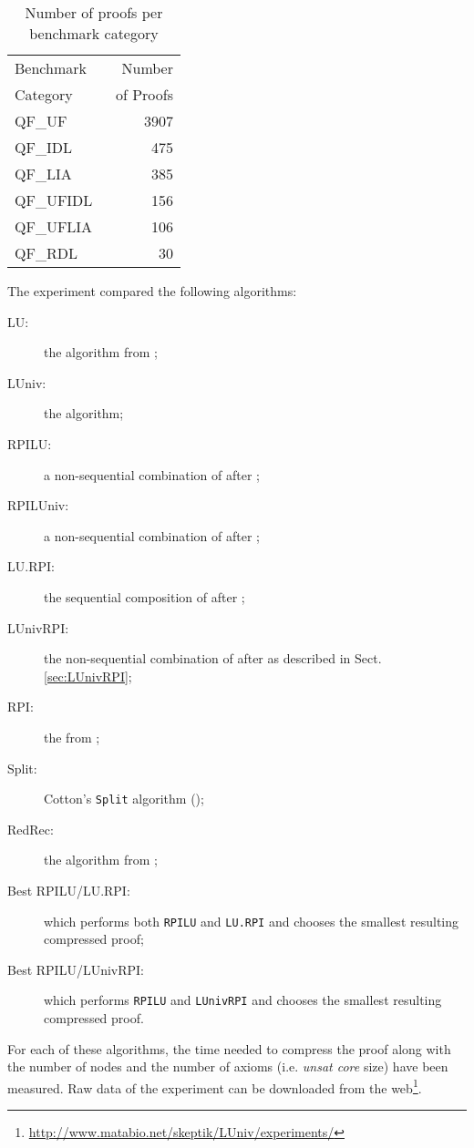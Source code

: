 \documentclass{llncs}
\begin{document}
\begin{table}[tb]
  \caption{Number of proofs per benchmark category}
  \label{tab:benchmarks}
  \centering
  \begin{tabular}{lr}
    \toprule
    Benchmark~ &  Number \\
    Category       & ~of Proofs \\
    \midrule
    QF\_UF      & 3907 \\
    QF\_IDL     &  475 \\
    QF\_LIA     &  385 \\
    QF\_UFIDL   &  156 \\
    QF\_UFLIA   &  106 \\
    QF\_RDL     &   30 \\
    \bottomrule
  \end{tabular}
\end{table}

The experiment compared the following algorithms:
\begin{description}
  \item[LU:] the {\LowerUnits} algorithm from \cite{LURPI};
  \item[LUniv:] the {\LowerUnivalents} algorithm;
  \item[RPILU:] a non-sequential combination of {\RPI} after {\LowerUnits};
  \item[RPILUniv:] a non-sequential combination of {\RPI} after {\LowerUnivalents};
  \item[LU.RPI:] the sequential composition of {\LowerUnits} after {\RPI};
  \item[LUnivRPI:] the non-sequential combination of {\LowerUnivalents} after {\RPI} as described in Sect. \ref{sec:LUnivRPI};
  \item[RPI:] the {\RecyclePivotsIntersection} from \cite{LURPI};
  \item[Split:] Cotton's \texttt{Split} algorithm (\cite{CottonSplit});
  \item[RedRec:] the {\ReduceReconstruct} algorithm from \cite{RedRec};
  \item[Best RPILU/LU.RPI:] which performs both \texttt{RPILU} and \texttt{LU.RPI} and chooses the smallest resulting compressed proof;
  \item[Best RPILU/LUnivRPI:] which performs \texttt{RPILU} and \texttt{LUnivRPI} and chooses the smallest resulting
    compressed proof.
\end{description}

For each of these algorithms, the time needed to compress the proof along with the number of nodes
and the number of axioms (i.e. \emph{unsat core} size) have been measured. Raw data of the
experiment can be downloaded from the web\footnote{\url{http://www.matabio.net/skeptik/LUniv/experiments/}}.
\end{document}
